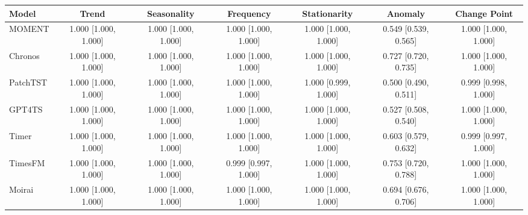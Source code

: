 \begin{tabular}{lcccccc}
\toprule
Model & Trend & Seasonality & Frequency & Stationarity & Anomaly & Change Point \\
\midrule
MOMENT & 1.000 [1.000, 1.000] & 1.000 [1.000, 1.000] & 1.000 [1.000, 1.000] & 1.000 [1.000, 1.000] & 0.549 [0.539, 0.565] & 1.000 [1.000, 1.000] \\
Chronos & 1.000 [1.000, 1.000] & 1.000 [1.000, 1.000] & 1.000 [1.000, 1.000] & 1.000 [1.000, 1.000] & 0.727 [0.720, 0.735] & 1.000 [1.000, 1.000] \\
PatchTST & 1.000 [1.000, 1.000] & 1.000 [1.000, 1.000] & 1.000 [1.000, 1.000] & 1.000 [0.999, 1.000] & 0.500 [0.490, 0.511] & 0.999 [0.998, 1.000] \\
GPT4TS & 1.000 [1.000, 1.000] & 1.000 [1.000, 1.000] & 1.000 [1.000, 1.000] & 1.000 [1.000, 1.000] & 0.527 [0.508, 0.540] & 1.000 [1.000, 1.000] \\
Timer & 1.000 [1.000, 1.000] & 1.000 [1.000, 1.000] & 1.000 [1.000, 1.000] & 1.000 [1.000, 1.000] & 0.603 [0.579, 0.632] & 0.999 [0.997, 1.000] \\
TimesFM & 1.000 [1.000, 1.000] & 1.000 [1.000, 1.000] & 0.999 [0.997, 1.000] & 1.000 [1.000, 1.000] & 0.753 [0.720, 0.788] & 1.000 [1.000, 1.000] \\
Moirai & 1.000 [1.000, 1.000] & 1.000 [1.000, 1.000] & 1.000 [1.000, 1.000] & 1.000 [1.000, 1.000] & 0.694 [0.676, 0.706] & 1.000 [1.000, 1.000] \\
\bottomrule
\end{tabular}
